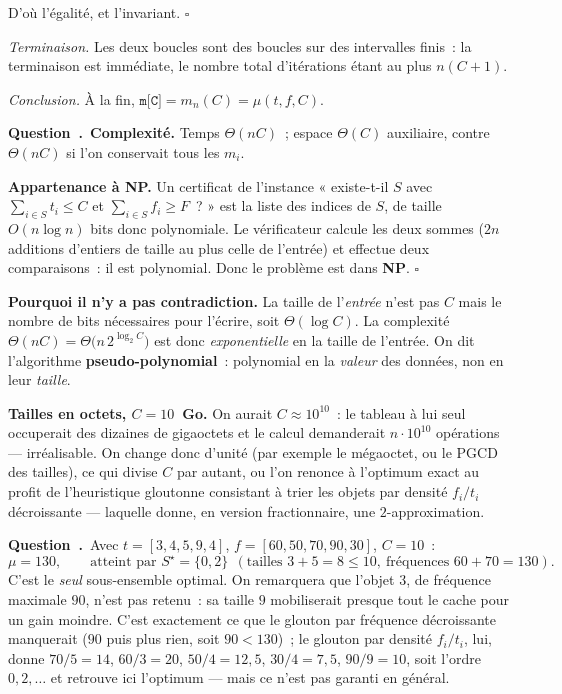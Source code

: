 \documentclass[11pt,a4paper]{article}
\renewcommand{\Q}{\medskip\par\stepcounter{qcnt}\noindent\textbf{\color{cnc}Question~\theqcnt.}~}
\begin{document}
D'où l'égalité, et l'invariant. \hfill$\square$

\emph{Terminaison.} Les deux boucles sont des boucles  sur des intervalles finis~:
la terminaison est immédiate, le nombre total d'itérations étant au plus $n(C+1)$.

\emph{Conclusion.} À la fin, $\texttt{m[C]}=m_n(C)=\mu(t,f,C)$.

\Q \textbf{Complexité.} Temps $\Theta(nC)$~; espace $\Theta(C)$ auxiliaire, contre
$\Theta(nC)$ si l'on conservait tous les $m_i$.

\textbf{Appartenance à NP.} Un certificat de l'instance « existe-t-il $S$ avec
$\sum_{i\in S}t_i\le C$ et $\sum_{i\in S}f_i\ge F$~? » est la liste des indices de $S$, de
taille $O(n\log n)$ bits donc polynomiale. Le vérificateur calcule les deux sommes ($2n$
additions d'entiers de taille au plus celle de l'entrée) et effectue deux comparaisons~: il
est polynomial. Donc le problème est dans \textbf{NP}. \hfill$\square$

\textbf{Pourquoi il n'y a pas contradiction.} La taille de l'\emph{entrée} n'est pas $C$ mais
le nombre de bits nécessaires pour l'écrire, soit $\Theta(\log C)$. La complexité
$\Theta(nC)=\Theta\big(n\,2^{\log_2 C}\big)$ est donc \emph{exponentielle} en la taille de
l'entrée. On dit l'algorithme \textbf{pseudo-polynomial}~: polynomial en la \emph{valeur} des
données, non en leur \emph{taille}.

\textbf{Tailles en octets, $C=10$~Go.} On aurait $C\approx 10^{10}$~: le tableau à lui seul
occuperait des dizaines de gigaoctets et le calcul demanderait $n\cdot 10^{10}$ opérations —
irréalisable. On change donc d'unité (par exemple le mégaoctet, ou le PGCD des tailles), ce
qui divise $C$ par autant, ou l'on renonce à l'optimum exact au profit de l'heuristique
gloutonne consistant à trier les objets par densité $f_i/t_i$ décroissante — laquelle donne,
en version fractionnaire, une $2$-approximation.

\Q Avec $t=[3,4,5,9,4]$, $f=[60,50,70,90,30]$, $C=10$~:
\[ \boxed{\mu=130},\qquad\text{atteint par } S^{\star}=\{0,2\}\ \ (\text{tailles } 3+5=8\le
10,\ \text{fréquences } 60+70=130). \]
C'est le \emph{seul} sous-ensemble optimal. On remarquera que l'objet $3$, de fréquence
maximale $90$, n'est pas retenu~: sa taille $9$ mobiliserait presque tout le cache pour un
gain moindre. C'est exactement ce que le glouton par fréquence décroissante manquerait
($90$ puis plus rien, soit $90<130$)~; le glouton par densité $f_i/t_i$, lui, donne
$70/5=14$, $60/3=20$, $50/4=12{,}5$, $30/4=7{,}5$, $90/9=10$, soit l'ordre $0,2,\dots$ et
retrouve ici l'optimum — mais ce n'est pas garanti en général.
\end{document}

